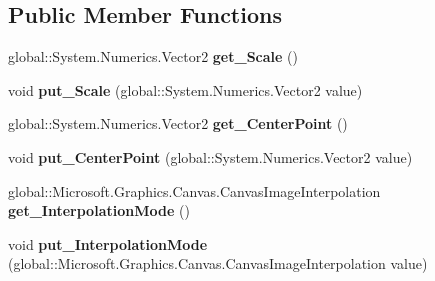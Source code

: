 \subsection*{Public Member Functions}
\begin{DoxyCompactItemize}
\item 
\mbox{\label{interface_microsoft_1_1_graphics_1_1_canvas_1_1_effects_1_1_i_scale_effect_afae9f41434e94bb89958e555bf403b47}} 
global\+::\+System.\+Numerics.\+Vector2 {\bfseries get\+\_\+\+Scale} ()
\item 
\mbox{\label{interface_microsoft_1_1_graphics_1_1_canvas_1_1_effects_1_1_i_scale_effect_a2945fd65d3f7df0e167dd527632d4244}} 
void {\bfseries put\+\_\+\+Scale} (global\+::\+System.\+Numerics.\+Vector2 value)
\item 
\mbox{\label{interface_microsoft_1_1_graphics_1_1_canvas_1_1_effects_1_1_i_scale_effect_abaa43e3b0b5b6f89987efd1e0930c4fa}} 
global\+::\+System.\+Numerics.\+Vector2 {\bfseries get\+\_\+\+Center\+Point} ()
\item 
\mbox{\label{interface_microsoft_1_1_graphics_1_1_canvas_1_1_effects_1_1_i_scale_effect_ae77c17d958bfacfc7652816c2fc67522}} 
void {\bfseries put\+\_\+\+Center\+Point} (global\+::\+System.\+Numerics.\+Vector2 value)
\item 
\mbox{\label{interface_microsoft_1_1_graphics_1_1_canvas_1_1_effects_1_1_i_scale_effect_a4fe4bd90b0fa1dfcf5e3831f15e73a81}} 
global\+::\+Microsoft.\+Graphics.\+Canvas.\+Canvas\+Image\+Interpolation {\bfseries get\+\_\+\+Interpolation\+Mode} ()
\item 
\mbox{\label{interface_microsoft_1_1_graphics_1_1_canvas_1_1_effects_1_1_i_scale_effect_aaaff922db5597526bd069b5b3cfa1bf3}} 
void {\bfseries put\+\_\+\+Interpolation\+Mode} (global\+::\+Microsoft.\+Graphics.\+Canvas.\+Canvas\+Image\+Interpolation value)

\end{DoxyCompactItemize}
